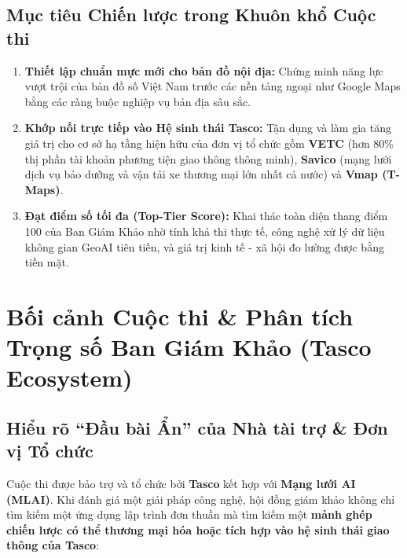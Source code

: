 \documentclass[11pt,a4paper]{article}
\begin{document}
\subsection{Mục tiêu Chiến lược trong Khuôn khổ Cuộc thi}
\begin{enumerate}
  \item \textbf{Thiết lập chuẩn mực mới cho bản đồ nội địa:} Chứng minh năng lực vượt trội của bản đồ số Việt Nam trước các nền tảng ngoại như Google Maps bằng các ràng buộc nghiệp vụ bản địa sâu sắc.
  \item \textbf{Khớp nối trực tiếp vào Hệ sinh thái Tasco:} Tận dụng và làm gia tăng giá trị cho cơ sở hạ tầng hiện hữu của đơn vị tổ chức gồm \textbf{VETC} (hơn 80\% thị phần tài khoản phương tiện giao thông thông minh), \textbf{Savico} (mạng lưới dịch vụ bảo dưỡng và vận tải xe thương mại lớn nhất cả nước) và \textbf{Vmap (T-Maps)}.
  \item \textbf{Đạt điểm số tối đa (Top-Tier Score):} Khai thác toàn diện thang điểm 100 của Ban Giám Khảo nhờ tính khả thi thực tế, công nghệ xử lý dữ liệu không gian GeoAI tiên tiến, và giá trị kinh tế - xã hội đo lường được bằng tiền mặt.
\end{enumerate}

\section{Bối cảnh Cuộc thi \& Phân tích Trọng số Ban Giám Khảo (Tasco Ecosystem)}

\subsection{Hiểu rõ ``Đầu bài Ẩn'' của Nhà tài trợ \& Đơn vị Tổ chức}
Cuộc thi được bảo trợ và tổ chức bởi \textbf{Tasco} kết hợp với \textbf{Mạng lưới AI (MLAI)}. Khi đánh giá một giải pháp công nghệ, hội đồng giám khảo không chỉ tìm kiếm một ứng dụng lập trình đơn thuần mà tìm kiếm một \textbf{mảnh ghép chiến lược có thể thương mại hóa hoặc tích hợp vào hệ sinh thái giao thông của Tasco}:
\end{document}
